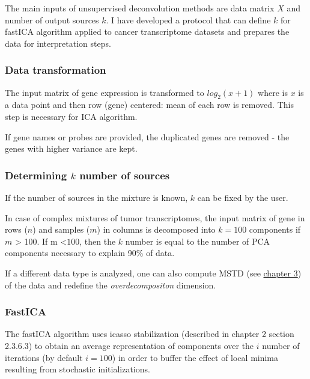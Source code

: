 \documentclass[12pt,]{book}
\theoremstyle{definition}
\theoremstyle{definition}
\theoremstyle{definition}
\theoremstyle{remark}
\begin{document}
The main inputs of unsupervised deconvolution methods are data matrix
\(X\) and number of output sources \(k\). I have developed a protocol
that can define \(k\) for fastICA algorithm applied to cancer
transcriptome datasets and prepares the data for interpretation steps.

\hypertarget{data-transformation}{%
\subsubsection{Data transformation}\label{data-transformation}}

The input matrix of gene expression is transformed to \(log_{2}(x +1)\)
where is \(x\) is a data point and then row (gene) centered: mean of
each row is removed. This step is necessary for ICA algorithm.

If gene names or probes are provided, the duplicated genes are removed -
the genes with higher variance are kept.

\hypertarget{determining-k-number-of-sources}{%
\subsubsection{\texorpdfstring{Determining \(k\) number of
sources}{Determining k number of sources}}\label{determining-k-number-of-sources}}

If the number of sources in the mixture is known, \(k\) can be fixed by
the user.

In case of complex mixtures of tumor transcriptomes, the input matrix of
gene in rows (\(n\)) and samples (\(m\)) in columns is decomposed into
\(k=100\) components if \(m\) \textgreater{} 100. If m
\textless{}\(100\), then the \(k\) number is equal to the number of PCA
components necessary to explain 90\% of data.

If a different data type is analyzed, one can also compute MSTD (see
\protect\hyperlink{mstd}{chapter 3}) of the data and redefine the
\emph{overdecompositon} dimension.

\hypertarget{fastica}{%
\subsubsection{FastICA}\label{fastica}}

The fastICA algorithm uses icasso stabilization (described in chapter 2
section 2.3.6.3) to obtain an average representation of components over
the \(i\) number of iterations (by default \(i=100\)) in order to buffer
the effect of local minima resulting from stochastic initializations.
\end{document}
